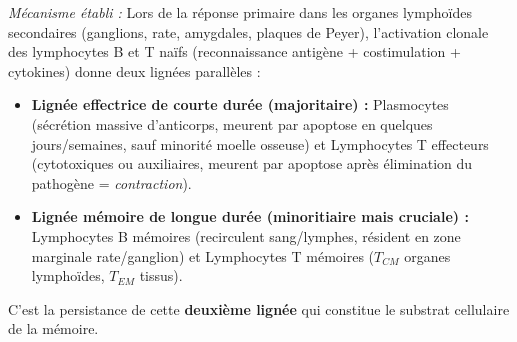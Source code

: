 \documentclass[11pt]{article}
\begin{document}
\emph{Mécanisme établi :} Lors de la réponse primaire dans les organes lymphoïdes secondaires (ganglions, rate, amygdales, plaques de Peyer), l'activation clonale des lymphocytes B et T naïfs (reconnaissance antigène + costimulation + cytokines) donne deux lignées parallèles :
\begin{itemize}
    \item \textbf{Lignée effectrice de courte durée (majoritaire) :} Plasmocytes (sécrétion massive d'anticorps, meurent par apoptose en quelques jours/semaines, sauf minorité moelle osseuse) et Lymphocytes T effecteurs (cytotoxiques ou auxiliaires, meurent par apoptose après élimination du pathogène = \emph{contraction}).
    \item \textbf{Lignée mémoire de longue durée (minoritiaire mais cruciale) :} Lymphocytes B mémoires (recirculent sang/lymphes, résident en zone marginale rate/ganglion) et Lymphocytes T mémoires ($T_{CM}$ organes lymphoïdes, $T_{EM}$ tissus).
\end{itemize}
C'est la persistance de cette \textbf{deuxième lignée} qui constitue le substrat cellulaire de la mémoire.
\end{document}
